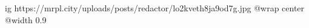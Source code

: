  
 
 
 
 

\ifcmt
  ig https://mrpl.city/uploads/posts/redactor/lo2kveth8ja9od7g.jpg
  @wrap center
  @width 0.9
\fi
